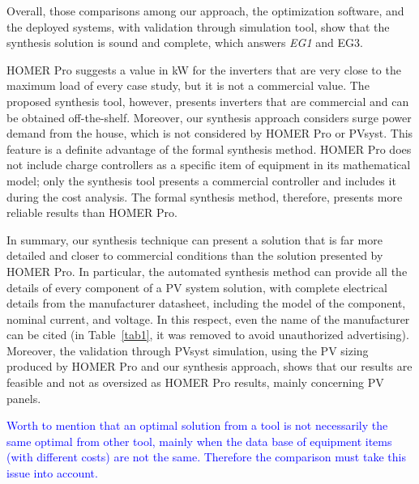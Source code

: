 \documentclass[runningheads]{llncs}
\begin{document}
Overall, those comparisons among our approach, the optimization software, and the deployed systems, with validation through simulation tool, show that the synthesis solution is sound and complete, which answers \textit{EG1} and {EG3}.

HOMER Pro suggests a value in kW for the inverters that are very close to the maximum load of every case study, but it is not a commercial value. The proposed synthesis tool, however, presents inverters that are commercial and can be obtained off-the-shelf. Moreover, our synthesis approach considers surge power demand from the house, which is not considered by HOMER Pro or PVsyst. This feature is a definite advantage of the formal synthesis method. HOMER Pro does not include charge controllers as a specific item of equipment in its mathematical model; only the synthesis tool presents a commercial controller and includes it during the cost analysis. The formal synthesis method, therefore, presents more reliable results than HOMER Pro.

In summary, our synthesis technique can present a solution that is far more detailed and closer to commercial conditions than the solution presented by HOMER Pro. In particular, the automated synthesis method can provide all the details of every component of a PV system solution, with complete electrical details from the manufacturer datasheet, including the model of the component, nominal current, and voltage. In this respect, even the name of the manufacturer can be cited (in Table~\ref{tab1}, it was removed to avoid unauthorized advertising). Moreover, the validation through PVsyst simulation, using the PV sizing produced by HOMER Pro and our synthesis approach, shows that our results are feasible and not as oversized as HOMER Pro results, mainly concerning PV panels.

\textcolor{blue}{Worth to mention that an optimal solution from a tool is not necessarily the same optimal from other tool, mainly when the data base of equipment items (with different costs) are not the same. Therefore the comparison must take this issue into account.} 

\end{document}
